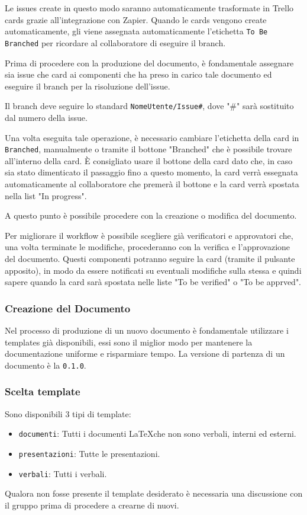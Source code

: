 Le issues create in questo modo saranno automaticamente trasformate in Trello cards grazie all'integrazione con Zapier.
Quando le cards vengono create automaticamente, gli viene assegnata automaticamente l'etichetta \texttt{To Be Branched} per ricordare al collaboratore di eseguire il branch.

Prima di procedere con la produzione del documento, è fondamentale assegnare sia issue che card ai componenti che ha preso in carico tale documento ed eseguire il branch per la risoluzione dell'issue.

Il branch deve seguire lo standard \texttt{NomeUtente/Issue\#}, dove "\#" sarà sostituito dal numero della issue.

Una volta eseguita tale operazione, è necessario cambiare l'etichetta della card in \texttt{Branched}, manualmente o tramite il bottone "Branched" che è possibile trovare all'interno della card.
È consigliato usare il bottone della card dato che, in caso sia stato dimenticato il passaggio fino a questo momento, la card verrà essegnata automaticamente al collaboratore che premerà il bottone e la card verrà spostata nella list "In progress".

A questo punto è possibile procedere con la creazione o modifica del documento.

Per migliorare il workflow è possibile scegliere già verificatori e approvatori che, una volta terminate le modifiche, procederanno con la verifica e l'approvazione del documento. Questi componenti potranno seguire la card (tramite il pulsante apposito), in modo da essere notificati su eventuali modifiche sulla stessa e quindi sapere quando la card sarà spostata nelle liste "To be verified" o "To be apprved".

\subsubsection{Creazione del Documento}
Nel processo di produzione di un nuovo documento è fondamentale utilizzare i templates già
disponibili, essi sono il miglior modo per mantenere la documentazione uniforme e
risparmiare tempo.
La versione di partenza di un documento è la \texttt{0.1.0}.

\subsubsection{Scelta template}

Sono disponibili 3 tipi di template:
\begin{itemize}
    \item \texttt{documenti}: Tutti i documenti \LaTeX che non sono verbali, interni ed esterni.
    \item \texttt{presentazioni}: Tutte le presentazioni.
    \item \texttt{verbali}: Tutti i verbali.
\end{itemize}
Qualora non fosse presente il template desiderato è necessaria una discussione con il gruppo prima di procedere a crearne di nuovi.

